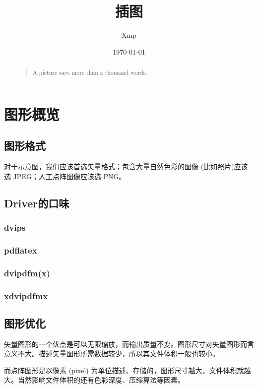 \documentclass[UTF8]{article}
\title{插图}
\author{Xmp}
\date{\today}
\begin{document}
\setcounter{tocdepth}{10}
\maketitle
\begin{abstract}
	\begin{quote}
		A picture says more than a thousand words.
		
		\reversemarginpar
	\end{quote}
\end{abstract}
\tableofcontents


\section{图形概览}
\subsection{图形格式}
对于示意图，我们应该首选矢量格式；包含大量自然色彩的图像 (比如照片)应该选 JPEG；人工点阵图像应该选 PNG。

\subsection{Driver的口味}
\subsubsection{dvips}
\subsubsection{pdflatex}
\subsubsection{dvipdfm(x)}
\subsubsection{xdvipdfmx}

\subsection{图形优化}
矢量图形的一个优点是可以无限缩放，而输出质量不变。图形尺寸对矢量图形而言意义不大。描述矢量图形所需数据较少，所以其文件体积一般也较小。

而点阵图形是以像素 (pixel) 为单位描述、存储的，图形尺寸越大，文件体积就越大。当然影响文件体积的还有色彩深度、压缩算法等因素。
\end{document}
